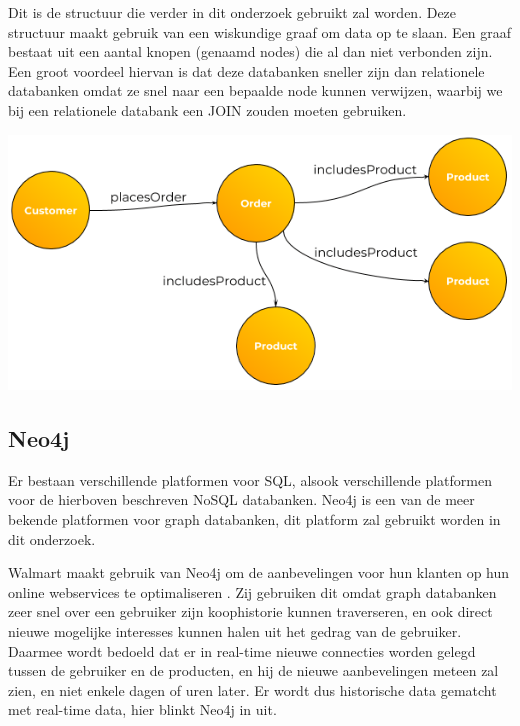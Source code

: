 Dit is de structuur die verder in dit onderzoek gebruikt zal worden. Deze structuur maakt gebruik van een wiskundige graaf om data op te slaan. Een graaf bestaat uit een aantal knopen (genaamd nodes) die al dan niet verbonden zijn. Een groot voordeel hiervan is dat deze databanken sneller zijn dan relationele databanken omdat ze snel naar een bepaalde node kunnen verwijzen, waarbij we bij een relationele databank een JOIN zouden moeten gebruiken. 

	\includegraphics[width=\linewidth]{img/Customer-Order-Example-Graph.png}
	
\subsection{Neo4j}
\label{sec:Neo4j}

Er bestaan verschillende platformen voor SQL, alsook verschillende platformen voor de hierboven beschreven NoSQL databanken. Neo4j is een van de meer bekende platformen voor graph databanken, dit platform zal gebruikt worden in dit onderzoek.

Walmart maakt gebruik van Neo4j om de aanbevelingen voor hun klanten op hun online webservices te optimaliseren \autocite{neo4jWalmart2014}. Zij gebruiken dit omdat graph databanken zeer snel over een gebruiker zijn koophistorie kunnen traverseren, en ook direct nieuwe mogelijke interesses kunnen halen uit het gedrag van de gebruiker. Daarmee wordt bedoeld dat er in real-time nieuwe connecties worden gelegd tussen de gebruiker en de producten, en hij de nieuwe aanbevelingen meteen zal zien, en niet enkele dagen of uren later. Er wordt dus historische data gematcht met real-time data, hier blinkt Neo4j in uit. 




